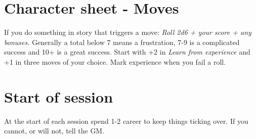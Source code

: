 \documentclass[letterpaper]{twentysecondcv} %
\begin{document}




\skillstext{}


\makeprofile %


\section{Character sheet - Moves}

If you do something in story that triggers a move: \emph{Roll 2d6 + your score + any bonuses.} 
Generally a total below 7 means a frustration, 7-9 is a complicated success and 10+ is a great success.
Start with +2 in \emph{Learn from experience} and +1 in three moves of your choice. Mark experience when you fail a roll.

\section{Start of session}
At the start of each session spend 1-2 career to keep things ticking over. If you cannot, or will not, tell the GM.
\end{document}
